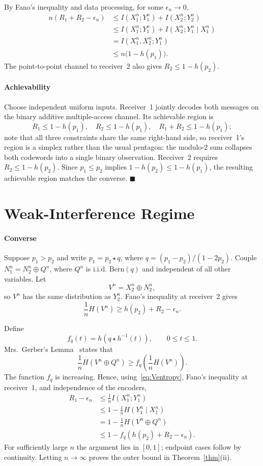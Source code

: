 \documentclass[12pt,draftclsnofoot,onecolumn,conference]{IEEEtran}
\newcommand{\st}{\star}
\begin{document}
By Fano's inequality and data processing, for some $\epsilon_n\to0$,
\begin{align*}
n(R_1+R_2-\epsilon_n)
&\le I(X_1^n;Y_1^n)+I(X_2^n;Y_2^n)\\
&\le I(X_1^n;Y_1^n)+I(X_2^n;Y_1^n\mid X_1^n)\\
&=I(X_1^n,X_2^n;Y_1^n)\\
&\le n\bigl(1-h(p_1)\bigr).
\end{align*}
The point-to-point channel to receiver~2 also gives
$R_2\le1-h(p_2)$.

\paragraph{Achievability}
Choose independent uniform inputs. Receiver~1 jointly decodes both messages
on the binary additive multiple-access channel. Its achievable region is
\[
R_1\le1-h(p_1),\quad R_2\le1-h(p_1),\quad
R_1+R_2\le1-h(p_1);
\]
note that all three constraints share the same right-hand side, so
receiver~1's region is a simplex rather than the usual pentagon: the
modulo-2 sum collapses both codewords into a single binary observation.
Receiver~2 requires $R_2\le1-h(p_2)$. Since $p_1\le p_2$ implies
$1-h(p_2)\le1-h(p_1)$, the resulting achievable region matches the converse.
\hfill$\blacksquare$

\section{Weak-Interference Regime}

\paragraph{Converse}
Suppose $p_1>p_2$ and write $p_1=p_2\st q$, where
$q=(p_1-p_2)/(1-2p_2)$. Couple
$N_1^n=N_2^n\oplus Q^n$, where $Q^n$ is i.i.d.
$\mathrm{Bern}(q)$ and independent of all other variables. Let
\[
V^n=X_2^n\oplus N_2^n,
\]
so $V^n$ has the same distribution as $Y_2^n$. Fano's inequality at
receiver~2 gives
\begin{equation}\label{eq:Ventropy}
\frac1nH(V^n)\ge h(p_2)+R_2-\epsilon_n.
\end{equation}

Define
\[
f_q(t)=h\!\left(q\st h^{-1}(t)\right),\qquad 0\le t\le1.
\]
Mrs.~Gerber's Lemma~\cite{WZ73a} states that
\[
\frac1nH(V^n\oplus Q^n)\ge
f_q\!\left(\frac1nH(V^n)\right).
\]
The function $f_q$ is increasing. Hence, using~\eqref{eq:Ventropy},
Fano's inequality at receiver~1, and independence of the encoders,
\begin{align*}
R_1-\epsilon_n
&\le \frac1n I(X_1^n;Y_1^n)\\
&\le 1-\frac1nH(Y_1^n\mid X_1^n)\\
&=1-\frac1nH(V^n\oplus Q^n)\\
&\le1-f_q\!\left(h(p_2)+R_2-\epsilon_n\right).
\end{align*}
For sufficiently large $n$ the argument lies in $[0,1]$; endpoint cases
follow by continuity. Letting $n\to\infty$ proves the outer bound in
Theorem~\ref{thm}(ii).
\end{document}

